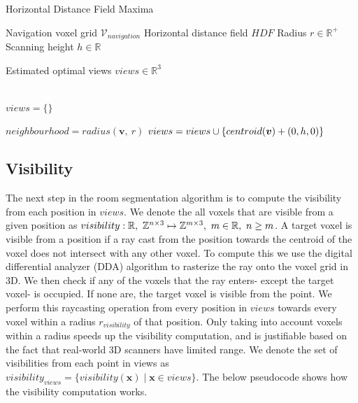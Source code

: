 \begin{algorithm}
    \caption{Horizontal Distance Field Maxima}
    \begin{algorithmic}

    \Require \quad Navigation voxel grid \(\mathcal{V}_{navigation}\)
    \Require \quad Horizontal distance field \(HDF\)
    \Require \quad Radius \(r \in \mathbb{R}^+\)
    \Require \quad Scanning height \(h \in \mathbb{R}\)

    \Ensure \quad Estimated optimal views $views \in \mathbb{R}^3$

    \\

    \State $views = \{\}$

        \State \(neighbourhood = radius(\boldsymbol{v},\ r)\)
         
            \State $views = views \cup \{centroid(\boldsymbol{v}) + (0, h, 0)\}$
        \EndIf
    \EndFor
    
    \end{algorithmic}
\end{algorithm}

\subsection{Visibility}
The next step in the room segmentation algorithm is to compute the visibility from each position in \(views\). We denote the all voxels that are visible from a given position as \(visibility: \mathbb{R},\ \mathbb{Z}^{n \times 3} \mapsto \mathbb{Z}^{m \times 3},\ m \in \mathbb{R},\ n \geq m\). A target voxel is visible from a position if a ray cast from the position towards the centroid of the voxel does not intersect with any other voxel. To compute this we use the digital differential analyzer (DDA) algorithm to rasterize the ray onto the voxel grid in 3D. We then check if any of the voxels that the ray enters- except the target voxel- is occupied. If none are, the target voxel is visible from the point. We perform this raycasting operation from every position in \(views\) towards every voxel within a radius \(r_{visibility}\) of that position. Only taking into account voxels within a radius speeds up the visibility computation, and is justifiable based on the fact that real-world 3D scanners have limited range. We denote the set of visibilities from each point in views as \(visibility_{views} = \{visibility(\boldsymbol{x}) \mid \boldsymbol{x} \in views\}\). The below pseudocode shows how the visibility computation works.

